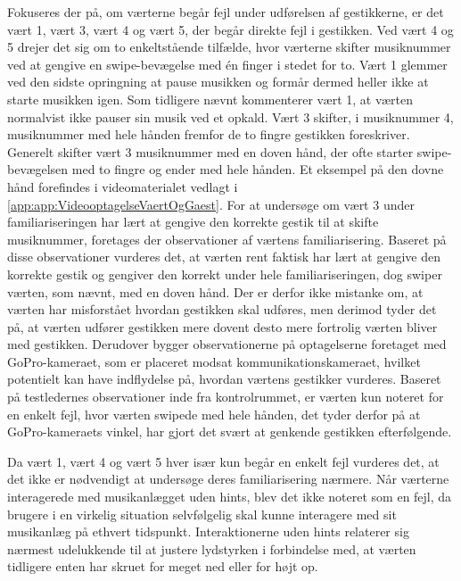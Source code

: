 Fokuseres der på, om værterne begår fejl under udførelsen af gestikkerne, er det vært 1, vært 3, vært 4 og vært 5, der begår direkte fejl i gestikken. Ved vært 4 og 5 drejer det sig om to enkeltstående tilfælde, hvor værterne skifter musiknummer ved at gengive en swipe-bevægelse med én finger i stedet for to. Vært 1 glemmer ved den sidste opringning at pause musikken og formår dermed heller ikke at starte musikken igen. Som tidligere nævnt kommenterer vært 1, at værten normalvist ikke pauser sin musik ved et opkald. Vært 3 skifter, i musiknummer 4, musiknummer med hele hånden fremfor de to fingre gestikken foreskriver. Generelt skifter vært 3 musiknummer med en doven hånd, der ofte starter swipe-bevægelsen med to fingre og ender med hele hånden. Et eksempel på den dovne hånd forefindes i videomaterialet vedlagt i \autoref{app:app:VideooptagelseVaertOgGaest}. For at undersøge om vært 3 under familiariseringen har lært at gengive den korrekte gestik til at skifte musiknummer, foretages der observationer af værtens familiarisering. Baseret på disse observationer vurderes det, at værten rent faktisk har lært at gengive den korrekte gestik og gengiver den korrekt under hele familiariseringen, dog swiper værten, som nævnt, med en doven hånd. Der er derfor ikke mistanke om, at værten har misforstået hvordan gestikken skal udføres, men derimod tyder det på, at værten udfører gestikken mere dovent desto mere fortrolig værten bliver med gestikken. Derudover bygger observationerne på optagelserne foretaget med GoPro-kameraet, som er placeret modsat kommunikationskameraet, hvilket potentielt kan have indflydelse på, hvordan værtens gestikker vurderes. Baseret på testledernes observationer inde fra kontrolrummet, er værten kun noteret for en enkelt fejl, hvor værten swipede med hele hånden, det tyder derfor på at GoPro-kameraets vinkel, har gjort det svært at genkende gestikken efterfølgende. 

Da vært 1, vært 4 og vært 5 hver især kun begår en enkelt fejl vurderes det, at det ikke er nødvendigt at undersøge deres familiarisering nærmere.\blankline
%
Når værterne interagerede med musikanlægget uden hints, blev det ikke noteret som en fejl, da brugere i en virkelig situation selvfølgelig skal kunne interagere med sit musikanlæg på ethvert tidspunkt. Interaktionerne uden hints relaterer sig nærmest udelukkende til at justere lydstyrken i forbindelse med, at værten tidligere enten har skruet for meget ned eller for højt op. 

